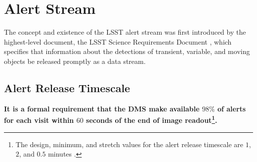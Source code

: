 \documentclass[DM,authoryear,toc]{lsstdoc}
\begin{document}

\section{Alert Stream} \label{sec:alerts}

The concept and existence of the LSST alert stream was first introduced by the highest-level document, the LSST Science Requirements Document , which specifies that information about the detections of transient, variable, and moving objects be released promptly as a data stream. 

\subsection{Alert Release Timescale}\label{ssec:OTT1}

{\bf It is a formal requirement that the DMS make available $98\%$ of alerts for each visit within $60$ seconds of the end of image readout\footnote{The design, minimum, and stretch values for the alert release timescale are $1$, $2$, and $0.5$ minutes .}.}
\end{document}
